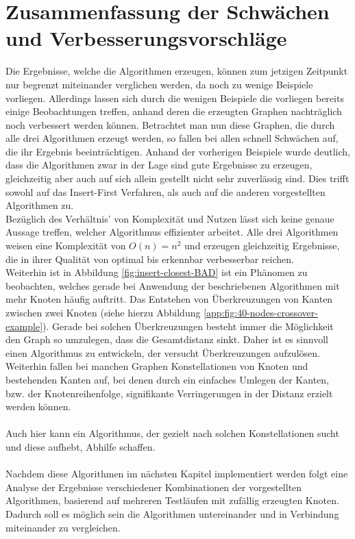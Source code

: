 \section{Zusammenfassung der Schwächen und Verbesserungsvorschläge}\label{sec:allBet}
Die Ergebnisse, welche die Algorithmen erzeugen, können zum jetzigen Zeitpunkt nur begrenzt miteinander verglichen werden, da noch zu wenige Beispiele vorliegen.
Allerdings lassen sich durch die wenigen Beispiele die vorliegen bereits einige Beobachtungen treffen, anhand deren die erzeugten Graphen nachträglich noch verbessert werden können.
Betrachtet man nun diese Graphen, die durch alle drei Algorithmen erzeugt werden, so fallen bei allen schnell Schwächen auf, die ihr Ergebnis beeinträchtigen.
Anhand der vorherigen Beispiele wurde deutlich, dass die Algorithmen zwar in der Lage sind gute Ergebnisse zu erzeugen, gleichzeitig aber auch auf sich allein gestellt nicht sehr zuverlässig sind.
Dies trifft sowohl auf das Insert-First Verfahren, als auch auf die anderen vorgestellten Algorithmen zu.
\\
Bezüglich des Verhältnis' von Komplexität und Nutzen lässt sich keine genaue Aussage treffen, welcher Algorithmus effizienter arbeitet.
Alle drei Algorithmen weisen eine Komplexität von $O(n) = n^2$ und erzeugen gleichzeitig Ergebnisse, die in ihrer Qualität von optimal bis erkennbar verbesserbar reichen. 
\\
Weiterhin ist in Abbildung \vref{fig:insert-closest-BAD} ist ein Phänomen zu beobachten, welches gerade bei Anwendung der beschriebenen Algorithmen mit mehr Knoten häufig auftritt.
Das Entstehen von Überkreuzungen von Kanten zwischen zwei Knoten (siehe hierzu Abbildung \vref{app:fig:40-nodes-crossover-example}).
Gerade bei solchen Überkreuzungen besteht immer die Möglichkeit den Graph so umzulegen, dass die Gesamtdistanz sinkt.
Daher ist es sinnvoll einen Algorithmus zu entwickeln, der versucht Überkreuzungen aufzulösen.
\\
Weiterhin fallen bei manchen Graphen Konstellationen von Knoten und bestehenden Kanten auf, bei denen durch ein einfaches Umlegen der Kanten, bzw. der Knotenreihenfolge, signifikante Verringerungen in der Distanz erzielt werden können.
\\\\
Auch hier kann ein Algorithmus, der gezielt nach solchen Konstellationen sucht und diese aufhebt, Abhilfe schaffen.
\\\\
Nachdem diese Algorithmen im nächsten Kapitel implementiert werden folgt eine Analyse der Ergebnisse verschiedener Kombinationen der vorgestellten Algorithmen, basierend auf mehreren Testläufen mit zufällig erzeugten Knoten.
Dadurch soll es möglich sein die Algorithmen untereinander und in Verbindung miteinander zu vergleichen.
